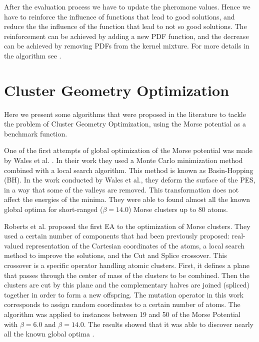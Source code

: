 						After the evaluation process we have to update the pheromone values. Hence we have to reinforce the influence of functions that lead to good solutions, and reduce the the influence of the function that lead to not so good solutions. The reinforcement can be achieved by adding a new PDF function, and the decrease can be achieved by removing PDFs from the kernel mixture.				
						For more details in the algorithm see \cite{socha04,socha08}.
					
	\pagebreak
			
	\section{Cluster Geometry Optimization}
		\label{subsec:cgo}
		Here we present some algorithms that were proposed in the literature to tackle the problem of Cluster Geometry Optimization, using the Morse potential as a benchmark function.

		One of the first attempts of global optimization of the Morse potential was made by Wales et al. \cite{wales97, doye97}. In their work they used a Monte Carlo minimization method \cite{li87} combined with a local search algorithm. This method is known as Basin-Hopping (BH). In the work conducted by Wales et al., they deform the surface of the PES, in a way that some of the valleys are removed. This transformation does not affect the energies of the minima. They were able to found almost all the known global optima for short-ranged ($\beta = 14.0$) Morse clusters up to 80 atoms.
		
		Roberts et al. \cite{roberts00} proposed the first EA to the optimization of Morse clusters. They used a certain number of components that had been previously proposed: real-valued representation of the Cartesian coordinates of the atoms, a local search method to improve the solutions, and the Cut and Splice \cite{deaven95} crossover. This crossover is a specific operator handling atomic clusters. First, it defines a plane that passes through the center of mass of the clusters to be combined. Then the clusters are cut by this plane and the complementary halves are joined (spliced) together in order to form a new offspring.
		The mutation operator in this work corresponds to assign random coordinates to a certain number of atoms. 
		The algorithm was applied to instances between 19 and 50 of the Morse Potential with $\beta = 6.0$ and $\beta = 14.0$. The results showed that it was able to discover nearly all the known global optima \cite{roberts00}.   
		

